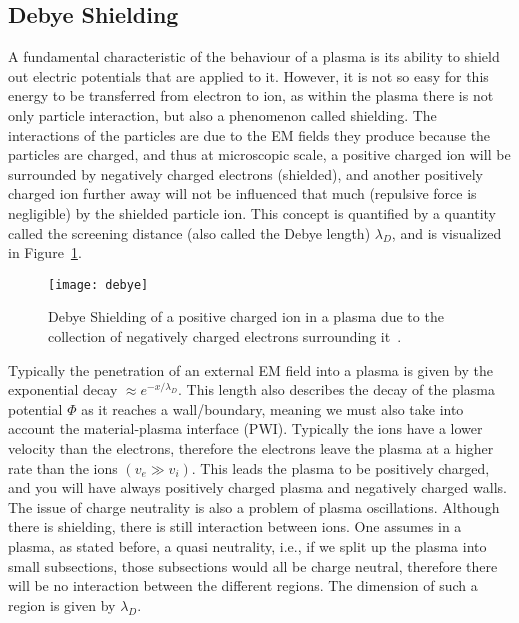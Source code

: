 \subsection{Debye Shielding}\label{subsec:debye-shielding}
A fundamental characteristic of the behaviour of a plasma is its ability to shield out electric potentials that are applied to it.
However, it is not so easy for this energy to be transferred from electron to ion, as within the plasma there is not only particle interaction, but also a phenomenon called shielding.
The interactions of the particles are due to the EM fields they produce because the particles are charged, and thus at microscopic scale, a positive charged ion will be surrounded by negatively charged electrons (shielded), and another positively charged ion further away will not be influenced that much (repulsive force is negligible) by the shielded particle ion.
This concept is quantified by a quantity called the screening distance (also called the Debye length) $\lambda_D$, and is visualized in Figure~\ref{fig:debye}.
\begin{figure}
	\centering
	\texttt{[image: debye]}
	\caption{Debye Shielding of a positive charged ion in a plasma due to the collection of negatively charged electrons surrounding it~\cite{chen}.}
	\label{fig:debye}
\end{figure}
Typically the penetration of an external EM field into a plasma is given by the exponential decay $ \approx e^{-x/\lambda_D}$.
This length also describes the decay of the plasma potential $\Phi$ as it reaches a wall/boundary, meaning we must also take into account the material-plasma interface (PWI).
Typically the ions have a lower velocity than the electrons, therefore the electrons leave the plasma at a higher rate than the ions $(v_e \gg v_i)$.
This leads the plasma to be positively charged, and you will have always positively charged plasma and negatively charged walls.
The issue of charge neutrality is also a problem of plasma oscillations.
Although there is shielding, there is still interaction between ions.
One assumes in a plasma, as stated before, a quasi neutrality, i.e., if we split up the plasma into small subsections, those subsections would all be charge neutral, therefore there will be no interaction between the different regions.
The dimension of such a region is given by $\lambda_D$.

